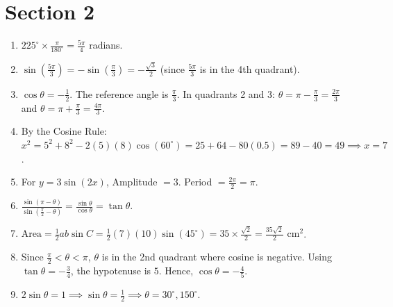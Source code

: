\documentclass[11pt,a4paper]{article}
\begin{document}
\section*{Section 2}
\begin{enumerate}
    
    \item $225^\circ \times \frac{\pi}{180^\circ} = \frac{5\pi}{4}$ radians.
    \vspace{0.5cm}

    \item $\sin\left(\frac{5\pi}{3}\right) = -\sin\left(\frac{\pi}{3}\right) = -\frac{\sqrt{3}}{2}$ (since $\frac{5\pi}{3}$ is in the 4th quadrant).
    \vspace{0.5cm}

    \item $\cos\theta = -\frac{1}{2}$. The reference angle is $\frac{\pi}{3}$. In quadrants 2 and 3:
    $\theta = \pi - \frac{\pi}{3} = \frac{2\pi}{3}$ and $\theta = \pi + \frac{\pi}{3} = \frac{4\pi}{3}$.
    \vspace{0.5cm}

    \item By the Cosine Rule:
    $x^2 = 5^2 + 8^2 - 2(5)(8)\cos(60^\circ) = 25 + 64 - 80(0.5) = 89 - 40 = 49 \implies x = 7$.
    \vspace{0.5cm}

    \item For $y = 3\sin(2x)$, Amplitude $= 3$. Period $= \frac{2\pi}{2} = \pi$.
    \vspace{0.5cm}

    \item $\frac{\sin(\pi - \theta)}{\sin(\frac{\pi}{2} - \theta)} = \frac{\sin \theta}{\cos \theta} = \tan \theta$.
    \vspace{0.5cm}

    \item $\text{Area} = \frac{1}{2}ab\sin C = \frac{1}{2}(7)(10)\sin(45^\circ) = 35 \times \frac{\sqrt{2}}{2} = \frac{35\sqrt{2}}{2} \text{ cm}^2$.
    \vspace{0.5cm}

    \item Since $\frac{\pi}{2} < \theta < \pi$, $\theta$ is in the 2nd quadrant where cosine is negative.
    Using $\tan \theta = -\frac{3}{4}$, the hypotenuse is $5$. Hence, $\cos \theta = -\frac{4}{5}$.
    \vspace{0.5cm}

    \item $2\sin\theta = 1 \implies \sin\theta = \frac{1}{2} \implies \theta = 30^\circ, 150^\circ$.
    \vspace{0.5cm}


\end{enumerate}
\end{document}
